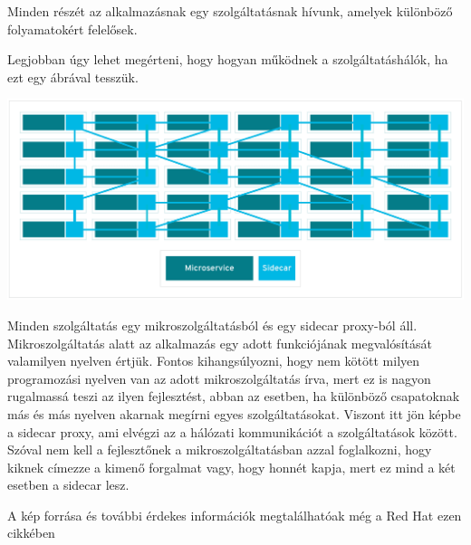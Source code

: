 \documentclass[a4paper,oneside]{article}
\begin{document}
Minden részét az alkalmazásnak egy szolgáltatásnak hívunk, amelyek 
különböző folyamatokért felelősek. 

Legjobban úgy lehet megérteni, hogy hogyan működnek a szolgáltatáshálók, ha 
ezt egy ábrával tesszük. 
\begin{center}
\includegraphics[width=\textwidth]{serviceMesh}
\end{center}
Minden szolgáltatás egy mikroszolgáltatásból és egy sidecar proxy-ból áll. 
Mikroszolgáltatás alatt az alkalmazás egy adott funkciójának megvalósítását 
valamilyen nyelven értjük. Fontos kihangsúlyozni, hogy nem kötött milyen 
programozási nyelven van az adott mikroszolgáltatás írva, mert ez is 
nagyon rugalmassá teszi az ilyen fejlesztést, abban az esetben, ha 
különböző csapatoknak más és más nyelven akarnak megírni egyes szolgáltatásokat. 
Viszont itt jön képbe a sidecar proxy, ami elvégzi az a hálózati 
kommunikációt a szolgáltatások között. Szóval nem kell a fejlesztőnek 
a mikroszolgáltatásban azzal foglalkozni, hogy kiknek címezze a kimenő 
forgalmat vagy, hogy honnét kapja, mert ez mind a két esetben a sidecar lesz. 

A kép forrása és további érdekes információk megtalálhatóak még a Red Hat ezen 
cikkében ~\cite{redhat}

\end{document}

